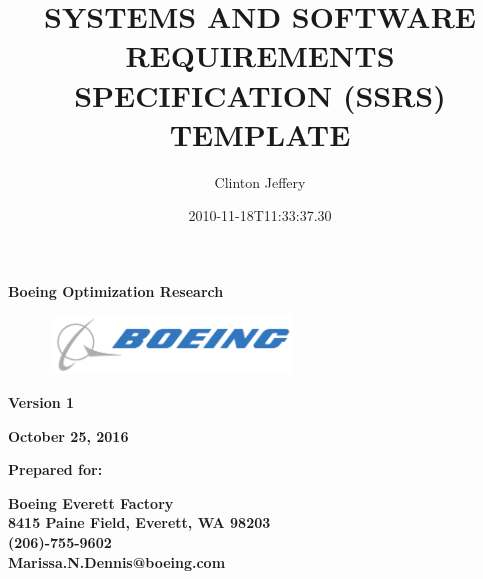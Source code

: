 \documentclass[twoside,letterpaper]{article}
\title{SYSTEMS AND SOFTWARE REQUIREMENTS SPECIFICATION (SSRS) TEMPLATE}
\author{Clinton Jeffery}
\date{2010-11-18T11:33:37.30}
\begin{document}
\clearpage\setcounter{page}{1}\pagestyle{Standard}
\thispagestyle{FirstPage}







\bigskip






\bigskip


{\centering{}\bfseries\color{black}
Boeing Optimization Research
\par}




\bigskip




\bigskip




\bigskip


{\centering{}\bfseries\color{black}
\includegraphics[width=3.4362in,height=0.6134in]{Boeing-Logo.png} %
\par}


\begin{figure}
\centering
\end{figure}


\bigskip




\bigskip


{\centering{}\bfseries\color{black}
Version 1
\par}


{\centering{}\bfseries\color{black}
October 25, 2016
\par}




\bigskip




\bigskip


{\centering{}\bfseries\color{black}
Prepared for:
\par}


{\centering{}\bfseries\color{black}
Boeing Everett Factory\\
8415 Paine Field, Everett, WA 98203\\
(206)-755-9602\\
Marissa.N.Dennis@boeing.com
\par}
\end{document}
